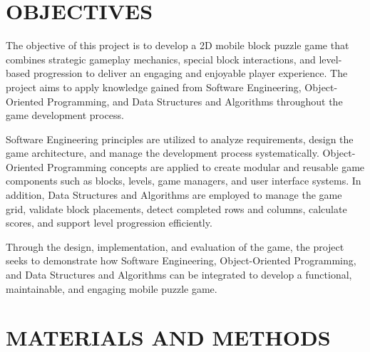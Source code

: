 \documentclass[a4paper,12pt]{report}
\begin{document}
\chapter{OBJECTIVES}
The objective of this project is to develop a 2D mobile block puzzle game that combines strategic gameplay mechanics, special block interactions, and level-based progression to deliver an engaging and enjoyable player experience. The project aims to apply knowledge gained from Software Engineering, Object-Oriented Programming, and Data Structures and Algorithms throughout the game development process.

Software Engineering principles are utilized to analyze requirements, design the game architecture, and manage the development process systematically. Object-Oriented Programming concepts are applied to create modular and reusable game components such as blocks, levels, game managers, and user interface systems. In addition, Data Structures and Algorithms are employed to manage the game grid, validate block placements, detect completed rows and columns, calculate scores, and support level progression efficiently.

Through the design, implementation, and evaluation of the game, the project seeks to demonstrate how Software Engineering, Object-Oriented Programming, and Data Structures and Algorithms can be integrated to develop a functional, maintainable, and engaging mobile puzzle game.

\chapter{MATERIALS AND METHODS}
\end{document}
